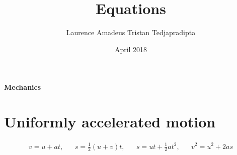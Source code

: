 \documentclass[a4paper]{article}
\title{Equations}
\author{Laurence Amadeus Tristan Tedjapradipta}
\date{April 2018}
\begin{document}
\begin{center}
    \Large{\textbf{Mechanics}}
\end{center}

\section{Uniformly accelerated motion}
\begin{align}
    v = u + at,  &&  s = \frac{1}{2}(u+v)t,  &&  s = ut + \frac{1}{2}at^2,  &&  v^2 = u^2 + 2as
\end{align}
\end{document}
